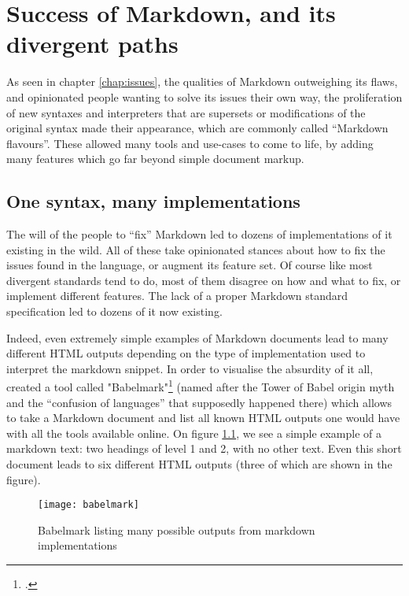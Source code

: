 \chapter{Success of Markdown, and its divergent paths}
\label{chap:proliferation}

\vspace{1cm}

As seen in chapter \ref{chap:issues}, the qualities of Markdown outweighing its flaws, and opinionated people wanting to solve its issues
their own way, the proliferation of new syntaxes and interpreters that are supersets or modifications of the original syntax made their appearance,
which are commonly called ``Markdown flavours''. These allowed many tools and use-cases to come to life, by adding many features which go far
beyond simple document markup.

\section{One syntax, many implementations}

The will of the people to ``fix'' Markdown led to dozens of implementations of it existing in the wild. All of these take opinionated stances
about how to fix the issues found in the language, or augment its feature set. Of course like most divergent standards tend to do, most of them
disagree on how and what to fix, or implement different features. The lack of a proper Markdown standard specification led to dozens of
it now existing.\newline

Indeed, even extremely simple examples of Markdown documents lead to many different HTML outputs depending on the type of implementation used
to interpret the markdown snippet. In order to visualise the absurdity of it all, \citeauthor{babelmark} created a tool called
"Babelmark"\footcite{babelmark} (named after the Tower of Babel origin myth and the ``confusion of languages'' that supposedly happened there)
which allows to take a Markdown document and list all known HTML outputs one would have with all the tools available online.
On figure \ref{fig:babelmark}, we see a simple example of a markdown text: two headings of level 1 and 2, with no other text.
Even this short document leads to six different HTML outputs (three of which are shown in the figure).

\begin{figure}[H]
\centering
\texttt{[image: babelmark]}
\caption{Babelmark listing many possible outputs from markdown implementations}
\label{fig:babelmark}
\end{figure}

